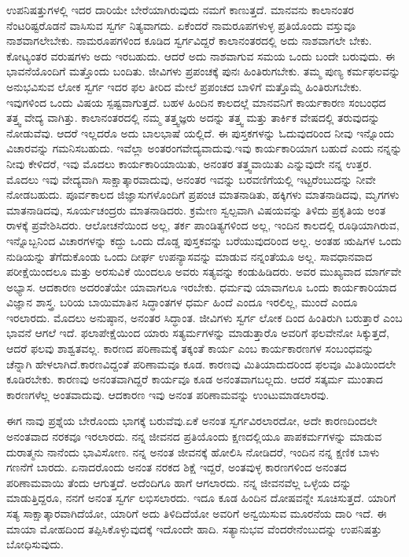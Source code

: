 ಉಪನಿಷತ್ತುಗಳಲ್ಲಿ ಇದರ ದಾರಿಯೇ ಬೇರೆಯಾಗಿರುವುದು ನಮಗೆ ಕಾಣುತ್ತದೆ. ಮಾನವನು ಕಾಲಾನಂತರ ನೆಂಟರಿಷ್ಟರೊಡನೆ ವಾಸಿಸುವ ಸ್ವರ್ಗ ನಿತ್ಯವಾಗದು. ಏಕೆಂದರೆ ನಾಮರೂಪಗಳುಳ್ಳ ಪ್ರತಿಯೊಂದು ವಸ್ತುವೂ ನಾಶವಾಗಲೇಬೇಕು. ನಾಮರೂಪಗಳಿಂದ ಕೂಡಿದ ಸ್ವರ್ಗವಿದ್ದರೆ ಕಾಲಾನಂತರದಲ್ಲಿ ಅದು ನಾಶವಾಗಲೇ ಬೇಕು. ಕೋಟ್ಯಂತರ ವರುಷಗಳು ಅದು ಇರಬಹುದು. ಆದರೆ ಅದು ನಾಶವಾಗುವ ಸಮಯ ಒಂದು ಬಂದೇ ಬರುವುದು. ಈ ಭಾವನೆಯೊಂದಿಗೆ ಮತ್ತೊಂದು ಬಂದಿತು. ಜೀವಿಗಳು ಪ್ರಪಂಚಕ್ಕೆ ಪುನಃ ಹಿಂತಿರುಗಬೇಕು. ತಮ್ಮ ಪುಣ್ಯ ಕರ್ಮಫಲವನ್ನು ಅನುಭವಿಸುವ ಲೋಕ ಸ್ವರ್ಗ ಇದರ ಫಲ ತೀರಿದ ಮೇಲೆ ಪ್ರಪಂಚದ ಬಾಳಿಗೆ ಮತ್ತೊಮ್ಮೆ ಹಿಂತಿರುಗಬೇಕು. ಇವುಗಳಿಂದ ಒಂದು ವಿಷಯ ಸ್ಪಷ್ಟವಾಗುತ್ತದೆ. ಬಹಳ ಹಿಂದಿನ ಕಾಲದಲ್ಲೆ ಮಾನವನಿಗೆ ಕಾರ್ಯಕಾರಣ ಸಂಬಂಧದ ತತ್ತ್ವ ವೇದ್ಯ ವಾಗಿತ್ತು. ಕಾಲಾನಂತರದಲ್ಲಿ ನಮ್ಮ ತತ್ತ್ವಜ್ಞರು ಅದನ್ನು ತತ್ತ್ವ ಮತ್ತು ತಾರ್ಕಿಕ ವೇಷದಲ್ಲಿ ತರುವುದನ್ನು ನೋಡುವೆವು. ಆದರೆ ಇಲ್ಲದರೊ ಅದು ಬಾಲಭಾಷೆ ಯಲ್ಲಿದೆ. ಈ ಪುಸ್ತಕಗಳನ್ನು ಓದುವುದರಿಂದ ನೀವು ಇನ್ನೊಂದು ವಿಚಾರವನ್ನು ಗಮನಿಸಬಹುದು. ಇವೆಲ್ಲಾ ಅಂತರಂಗವೇದ್ಯವಾದುವು.ಇವು ಕಾರ್ಯಕಾರಿಯಾಗ ಬಹುದೆ ಎಂದು ನನ್ನನ್ನು ನೀವು ಕೇಳಿದರೆ, ಇವು ಮೊದಲು ಕಾರ್ಯಕಾರಿಯಾಯಿತು, ಅನಂತರ ತತ್ತ್ವವಾಯಿತು ಎನ್ನುವುದೇ ನನ್ನ ಉತ್ತರ. ಮೊದಲು ಇವು ವೇದ್ಯವಾಗಿ ಸಾಕ್ಷಾತ್ಕಾರವಾದುವು, ಅನಂತರ ಇವನ್ನು ಬರವಣಿಗೆಯಲ್ಲಿ ಇಟ್ಟರೆಂಬುದನ್ನು ನೀವೇ ನೋಡಬಹುದು. ಪೂರ್ವಕಾಲದ ಜಿಜ್ಞಾಸುಗಳೊಂದಿಗೆ ಪ್ರಪಂಚ ಮಾತನಾಡಿತು, ಹಕ್ಕಿಗಳು ಮಾತನಾಡಿದವು, ಮೃಗಗಳು ಮಾತನಾಡಿದವು, ಸೂರ್ಯಚಂದ್ರರು ಮಾತನಾಡಿದರು. ಕ್ರಮೇಣ ಸ್ವಲ್ಪವಾಗಿ ವಿಷಯವನ್ನು ತಿಳಿದು ಪ್ರಕೃತಿಯ ಅಂತ ರಾಳಕ್ಕೆ ಪ್ರವೇಶಿಸಿದರು. ಆಲೋಚನೆಯಿಂದ ಅಲ್ಲ, ತರ್ಕ ಪಾಂಡಿತ್ಯಗಳಿಂದ ಅಲ್ಲ, ಇಂದಿನ ಕಾಲದಲ್ಲಿ ರೂಢಿಯಾಗಿರುವ, ಇನ್ನೊಬ್ಬನಿಂದ ವಿಚಾರಗಳನ್ನು ಕದ್ದು ಒಂದು ದೊಡ್ಡ ಪುಸ್ತಕವನ್ನು ಬರೆಯುವುದರಿಂದ ಅಲ್ಲ. ಅಂತಹ ಋಷಿಗಳ ಒಂದು ನುಡಿಯನ್ನು ತೆಗೆದುಕೊಂಡು ಒಂದು ದೀರ್ಘ ಉಪನ್ಯಾಸವನ್ನು ಮಾಡುವ ನನ್ನಂತೆಯೂ ಅಲ್ಲ. ಸಾವಧಾನವಾದ ಪರೀಕ್ಷೆಯಿಂದಲೂ ಮತ್ತು ಅರಸುವಿಕೆ ಯಿಂದಲೂ ಅವರು ಸತ್ಯವನ್ನು ಕಂಡುಹಿಡಿದರು. ಅವರ ಮುಖ್ಯವಾದ ಮಾರ್ಗವೇ ಅಭ್ಯಾಸ. ಆದಕಾರಣ ಅದರಂತೆಯೇ ಯಾವಾಗಲೂ ಇರಬೇಕು. ಧರ್ಮವು ಯಾವಾಗಲೂ ಒಂದು ಕಾರ್ಯಕಾರಿಯಾದ ವಿಜ್ಞಾನ ಶಾಸ್ತ್ರ. ಬರಿಯ ಬಾಯಿಮಾತಿನ ಸಿದ್ಧಾಂತಗಳ ಧರ್ಮ ಹಿಂದೆ ಎಂದೂ ಇರಲಿಲ್ಲ, ಮುಂದೆ ಎಂದೂ ಇರಲಾರದು. ಮೊದಲು ಅನುಷ್ಠಾನ, ಅನಂತರ ಸಿದ್ಧಾಂತ. ಜೀವಿಗಳು ಸ್ವರ್ಗ ಲೋಕ ದಿಂದ ಹಿಂತಿರುಗಿ ಬರುತ್ತಾರೆ ಎಂಬ ಭಾವನೆ ಆಗಲೆ ಇದೆ. ಫಲಾಪೇಕ್ಷೆಯಿಂದ ಯಾರು ಸತ್ಯರ್ಮಗಳನ್ನು ಮಾಡುತ್ತಾರೊ ಅವರಿಗೆ ಫಲವೇನೋ ಸಿಕ್ಕುತ್ತದೆ, ಆದರೆ ಫಲವು ಶಾಶ್ವತವಲ್ಲ. ಕಾರಣದ ಪರಿಣಾಮಕ್ಕೆ ತಕ್ಕಂತೆ ಕಾರ್ಯ ಎಂಬ ಕಾರ್ಯಕಾರಣಗಳ ಸಂಬಂಧವನ್ನು ಚೆನ್ನಾಗಿ ಹೇಳಲಾಗಿದೆ.ಕಾರಣವಿದ್ದಂತೆ ಪರಿಣಾಮವೂ ಕೂಡ. ಕಾರಣವು ಮಿತಿಯಾದುದರಿಂದ ಫಲವೂ ಮಿತಿಯಿಂದಲೇ ಕೂಡಿರಬೇಕು. ಕಾರಣವು ಅನಂತವಾಗಿದ್ದರೆ ಕಾರ್ಯವೂ ಕೂಡ ಅನಂತವಾಗಬಲ್ಲದು. ಆದರೆ ಸತ್ಕರ್ಮ ಮುಂತಾದ ಕಾರಣಗಳೆಲ್ಲ ಅಂತವಾದುವು. ಆದಕಾರಣ ಇವು ಅನಂತ ಪರಿಣಾಮವನ್ನು ಉಂಟುಮಾಡಲಾರವು.

ಈಗ ನಾವು ಪ್ರಶ್ನೆಯ ಬೇರೊಂದು ಭಾಗಕ್ಕೆ ಬರುವೆವು.ಏಕೆ ಅನಂತ ಸ್ವರ್ಗವಿರಲಾರದೋ, ಅದೇ ಕಾರಣದಿಂದಲೇ ಅನಂತವಾದ ನರಕವೂ ಇರಲಾರದು. ನನ್ನ ಜೀವನದ ಪ್ರತಿಯೊಂದು ಕ್ಷಣದಲ್ಲಿಯೂ ಪಾಪಕರ್ಮಗಳನ್ನು ಮಾಡುವ ದುರಾತ್ಮನು ನಾನೆಂದು ಭಾವಿಸೋಣ. ನನ್ನ ಅನಂತ ಜೀವನಕ್ಕೆ ಹೋಲಿಸಿ ನೋಡಿದರೆ, ಇಂದಿನ ನನ್ನ ಕ್ಷಣಿಕ ಬಾಳು ಗಣನೆಗೆ ಬಾರದು. ಏನಾದರೊಂದು ಅನಂತ ನರಕದ ಶಿಕ್ಷೆ ಇದ್ದರೆ, ಅಂತವುಳ್ಳ ಕಾರಣಗಳಿಂದ ಅನಂತದ ಪರಿಣಾಮವಾಯಿ ತೆಂದು ಆಗುತ್ತದೆ. ಅದೆಂದಿಗೂ ಹಾಗೆ ಆಗಲಾರದು. ನನ್ನ ಜೀವನವೆಲ್ಲ ಒಳ್ಳೆಯ ದನ್ನು ಮಾಡುತ್ತಿದ್ದರೂ, ನನಗೆ ಅನಂತ ಸ್ವರ್ಗ ಲಭಿಸಲಾರದು. ಇದೂ ಕೂಡ ಹಿಂದಿನ ದೋಷವನ್ನೇ ಸೂಚಿಸುತ್ತದೆ. ಯಾರಿಗೆ ಸತ್ಯ ಸಾಕ್ಷಾತ್ಕಾರವಾಗಿದೆಯೋ, ಯಾರಿಗೆ ಅದು ತಿಳಿದಿದೆಯೋ ಅವರಿಗೆ ಅನ್ವಯಿಸುವ ಮೂರನೆಯ ದಾರಿ ಇದೆ. ಈ ಮಾಯಾ ಮೋಹದಿಂದ ತಪ್ಪಿಸಿಕೊಳ್ಳುವುದಕ್ಕೆ ಇದೊಂದೇ ಹಾದಿ. ಸತ್ಯಾನುಭವ ವೆಂದರೇನೆಂಬುದನ್ನು ಉಪನಿಷತ್ತು ಬೋಧಿಸುವುದು.


